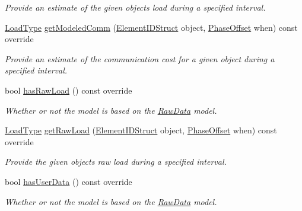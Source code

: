 \begin{DoxyCompactItemize}
\begin{DoxyCompactList}\small\item\em Provide an estimate of the given object\textquotesingle{}s load during a specified interval. \end{DoxyCompactList}\item 
\hyperlink{namespacevt_a8fb51741340b87d7aaee0bef60e9896b}{Load\+Type} \hyperlink{classvt_1_1vrt_1_1collection_1_1balance_1_1_composed_model_a500c3cd4c8e63cfdeea3edb5ddbcba47}{get\+Modeled\+Comm} (\hyperlink{namespacevt_1_1vrt_1_1collection_1_1balance_a9f5b53fafb270212279a4757d2c4cd28}{Element\+I\+D\+Struct} object, \hyperlink{structvt_1_1vrt_1_1collection_1_1balance_1_1_phase_offset}{Phase\+Offset} when) const override
\begin{DoxyCompactList}\small\item\em Provide an estimate of the communication cost for a given object during a specified interval. \end{DoxyCompactList}\item 
bool \hyperlink{classvt_1_1vrt_1_1collection_1_1balance_1_1_composed_model_ad6e2a1c572a80e35acad0fcf1a0e8071}{has\+Raw\+Load} () const override
\begin{DoxyCompactList}\small\item\em Whether or not the model is based on the \hyperlink{structvt_1_1vrt_1_1collection_1_1balance_1_1_raw_data}{Raw\+Data} model. \end{DoxyCompactList}\item 
\hyperlink{namespacevt_a8fb51741340b87d7aaee0bef60e9896b}{Load\+Type} \hyperlink{classvt_1_1vrt_1_1collection_1_1balance_1_1_composed_model_a290b32e5baedcd01d38170937514c145}{get\+Raw\+Load} (\hyperlink{namespacevt_1_1vrt_1_1collection_1_1balance_a9f5b53fafb270212279a4757d2c4cd28}{Element\+I\+D\+Struct} object, \hyperlink{structvt_1_1vrt_1_1collection_1_1balance_1_1_phase_offset}{Phase\+Offset} when) const override
\begin{DoxyCompactList}\small\item\em Provide the given object\textquotesingle{}s raw load during a specified interval. \end{DoxyCompactList}\item 
bool \hyperlink{classvt_1_1vrt_1_1collection_1_1balance_1_1_composed_model_aec716d7c9de7e8e8601e0baae6c2b51e}{has\+User\+Data} () const override
\begin{DoxyCompactList}\small\item\em Whether or not the model is based on the \hyperlink{structvt_1_1vrt_1_1collection_1_1balance_1_1_raw_data}{Raw\+Data} model. \end{DoxyCompactList}\item 

\end{DoxyCompactItemize}
